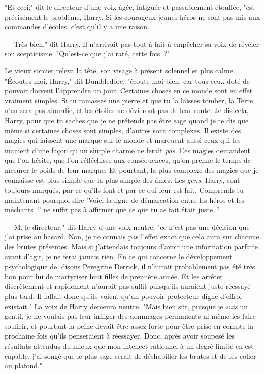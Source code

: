 "Et ceci," dit le directeur d'une voix âgée, fatiguée et passablement étouffée, "est précisément le problème, Harry. Si les courageux jeunes héros ne sont pas mis aux commandes d'écoles, c'est qu'il y a une raison.

--- Très bien," dit Harry. Il n'arrivait pas tout à fait à empêcher sa voix de révéler son scepticisme. "Qu'est-ce que j'ai raté, cette fois~?"

Le vieux sorcier releva la tête, son visage à présent solennel et plus calme. "Écoutes-moi, Harry," dit Dumbledore, "écoute-moi bien, car tous ceux doté de pouvoir doivent l'apprendre un jour. Certaines choses en ce monde sont en effet vraiment simples. Si tu ramasses une pierre et que tu la laisses tomber, la Terre n'en sera pas alourdie, et les étoiles ne dévieront pas de leur route. Je dis cela, Harry, pour que tu saches que je ne prétends pas être sage quand je te dis que même si certaines choses sont simples, d'autres sont complexes. Il existe des magies qui laissent une marque sur le monde et marquent aussi ceux qui les manient d'une façon qu'un simple charme ne ferait \emph{pas}. Ces magies demandent que l'on hésite, que l'on réfléchisse aux conséquences, qu'on prenne le temps de mesurer le poids de leur marque. Et pourtant, la plus complexe des magies que je connaisse est plus simple que la plus simple des âmes. Les \emph{gens}, Harry, sont toujours marqués, par ce qu'ils font et par ce qui leur est fait. Comprends-tu maintenant pourquoi dire 'Voici la ligne de démarcation entre les héros et les méchants~!' ne suffit pas à affirmer que ce que tu as fait était juste~?

--- M. le directeur," dit Harry d'une voix neutre, "ce n'est pas une décision que j'ai prise au hasard. Non, je ne connais pas l'effet exact que cela aura sur chacune des brutes présentes. Mais si j'attendais toujours d'avoir une information parfaite avant d'agir, je ne ferai jamais rien. En ce qui concerne le développement psychologique de, disons Peregrine Derrick, il n'aurait probablement pas été très bon pour lui de martyriser huit filles de première année. Et les arrêter discrètement et rapidement n'aurait pas suffit puisqu'ils auraient juste réessayé plus tard. Il fallait donc qu'ils voient qu'un pouvoir protecteur digne d'effroi existait." La voix de Harry demeura neutre. "Mais bien sûr, puisque je \emph{suis} un gentil, je ne voulais pas leur infliger des dommages permanents ni même les faire souffrir, et pourtant la peine devait être assez forte pour être prise en compte la prochaine fois qu'ils penseraient à réessayer. Donc, après avoir soupesé les résultats attendus du mieux que mon intellect rationnel à un degré limité en est capable, j'ai songé que le plus sage serait de déshabiller les brutes et de les coller au plafond."

